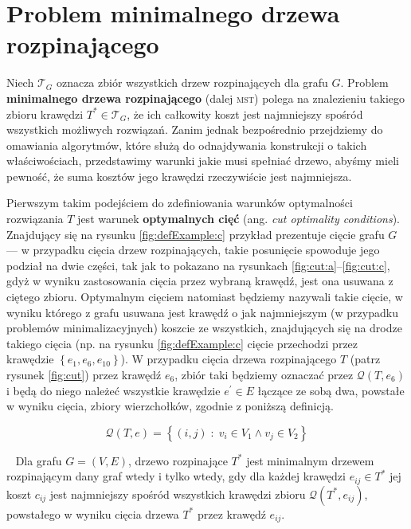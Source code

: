 \section{Problem minimalnego drzewa rozpinającego}\label{sec:mst}

Niech $\mathcal{T}_{G}$ oznacza zbiór wszystkich drzew rozpinających dla grafu $G$. Problem \textbf{minimalnego drzewa rozpinającego} (dalej \textsc{mst}) polega na znalezieniu takiego zbioru krawędzi $T^{\ast} \in \mathcal{T}_{G}$, że ich całkowity koszt jest najmniejszy spośród wszystkich możliwych rozwiązań. Zanim jednak bezpośrednio przejdziemy do omawiania algorytmów, które służą do odnajdywania konstrukcji o takich właściwościach, przedstawimy warunki jakie musi spełniać drzewo, abyśmy mieli pewność, że suma kosztów jego krawędzi rzeczywiście jest najmniejsza.

Pierwszym takim podejściem do zdefiniowania warunków optymalności rozwiązania $T$ jest warunek \textbf{optymalnych cięć} (ang. \textit{cut optimality conditions}). Znajdujący się na rysunku \ref{fig:defExample:c} przykład prezentuje cięcie grafu $G$ --- w przypadku cięcia drzew rozpinających, takie posunięcie spowoduje jego podział na dwie części, tak jak to pokazano na rysunkach \ref{fig:cut:a}--\ref{fig:cut:c}, gdyż w wyniku zastosowania cięcia przez wybraną krawędź, jest ona usuwana z ciętego zbioru. Optymalnym cięciem natomiast będziemy nazywali takie cięcie, w wyniku którego z grafu usuwana jest krawędź o jak najmniejszym (w przypadku problemów minimalizacyjnych) koszcie ze wszystkich, znajdujących się na drodze takiego cięcia (np. na rysunku \ref{fig:defExample:c} cięcie przechodzi przez krawędzie $\left\{ e_{1}, e_{6}, e_{10} \right\}$). W przypadku cięcia drzewa rozpinającego $T$ (patrz rysunek \ref{fig:cut}) przez krawędź $e_{6}$, zbiór taki będziemy oznaczać przez $\mathcal{Q} \left( T, e_{6} \right)$ i będą do niego należeć wszystkie krawędzie $e^{\prime} \in E$ łączące ze sobą dwa, powstałe w wyniku cięcia, zbiory wierzchołków, zgodnie z poniższą definicją.

\begin{equation}\label{eq:treecutedgeset}
\mathcal{Q} \left( T, e \right) = \left\{ \left( i, j \right) \; : \; v_{i} \in V_{1} \wedge v_{j} \in V_{2} \right\}
\end{equation}

\begin{theorem}\label{def:optmstcut}~\cite[$516$--$518$]{Ahuja:1993:NFT:137406}
	Dla grafu $G = \left( V, E \right)$, drzewo rozpinające $T^{\ast}$ jest minimalnym drzewem rozpinającym dany graf wtedy i tylko wtedy, gdy dla każdej krawędzi $e_{ij} \in T^{\ast}$ jej koszt $c_{ij}$ jest najmniejszy spośród wszystkich krawędzi zbioru $\mathcal{Q} \left( T^{\ast}, e_{ij} \right)$, powstałego w wyniku cięcia drzewa $T^{\ast}$ przez krawędź $e_{ij}$.
\end{theorem}


